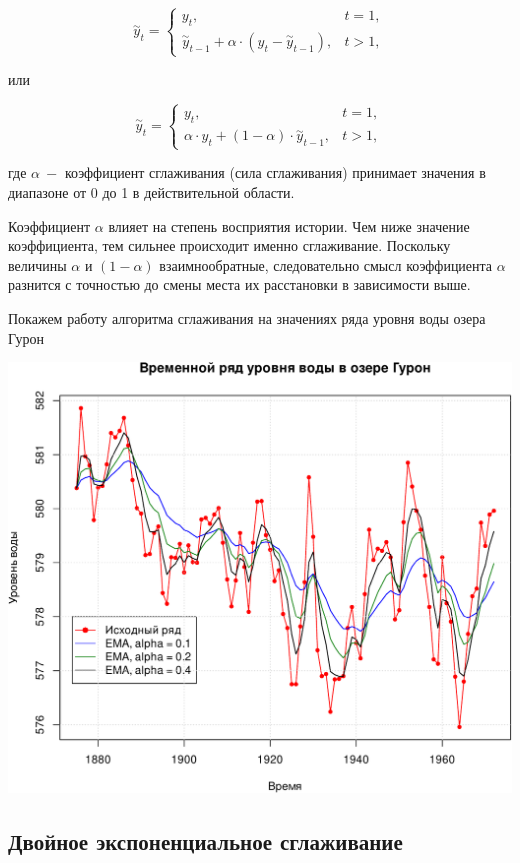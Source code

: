 \documentclass[
]{article}
\begin{document}
\[
\overset{\sim}{y}_t = \left\{ \begin{matrix} y_t, & t = 1,\\
\overset{\sim}{y}_{t-1} + \alpha\cdot ({y}_t - \overset{\sim}{y}_{t-1}), & t > 1,\end{matrix} \right.
\]

или

\[
\overset{\sim}{y}_t = \left\{ \begin{matrix} y_t, & t = 1,\\
\alpha \cdot {y}_t + (1 - \alpha) \cdot \overset{\sim}{y}_{t-1}, & t > 1,\end{matrix} \right.
\]

где \(\alpha\ -\) коэффициент сглаживания (сила сглаживания) принимает
значения в диапазоне от 0 до 1 в действительной области.

Коэффициент \(\alpha\) влияет на степень восприятия истории. Чем ниже
значение коэффициента, тем сильнее происходит именно сглаживание.
Поскольку величины \(\alpha\) и \((1 - \alpha)\) взаимнообратные,
следовательно смысл коэффициента \(\alpha\) разнится с точностью до
смены места их расстановки в зависимости выше.

Покажем работу алгоритма сглаживания на значениях ряда уровня воды озера
Гурон

\begin{center}\includegraphics[width=0.6\linewidth]{Prac6_files/figure-latex/unnamed-chunk-12-1} \end{center}

\hypertarget{ux434ux432ux43eux439ux43dux43eux435-ux44dux43aux441ux43fux43eux43dux435ux43dux446ux438ux430ux43bux44cux43dux43eux435-ux441ux433ux43bux430ux436ux438ux432ux430ux43dux438ux435}{%
\subsection{\texorpdfstring{\textbf{Двойное экспоненциальное
сглаживание}}{Двойное экспоненциальное сглаживание}}\label{ux434ux432ux43eux439ux43dux43eux435-ux44dux43aux441ux43fux43eux43dux435ux43dux446ux438ux430ux43bux44cux43dux43eux435-ux441ux433ux43bux430ux436ux438ux432ux430ux43dux438ux435}}
\end{document}
